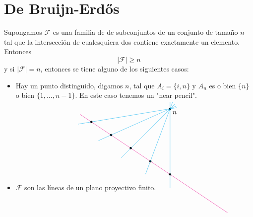 \documentclass[spanish]{book}
\theoremstyle{definition}
\begin{document}
\section{De Bruijn-Erdős}
\begin{teo}
	Supongamos $\mathcal{F}$ es una familia de de subconjuntos de un conjunto de tamaño $n$ tal que la intersección de cualesquiera dos contiene exactamente un elemento. Entonces
	\[|\mathcal{F}|\geq n\]
	y si $|\mathcal{F}|=n$, entonces se tiene alguno de los siguientes casos:
	\begin{itemize}
		\item Hay un punto distinguido, digamos $n$, tal que $A_i=\{i,n\}$ y $A_n$ es o bien $\{n\}$ o bien $\{1,\ldots,n-1\}$. En este caso tenemos un "near pencil".
		
		\[\begin{tikzpicture}
			\draw[magenta, shorten >=-100pt, shorten <=-20pt] (-2,4/3) -- (2,-4/3);
			
			\filldraw (2,2) circle (0.05) node[below right] {$n$};
			
			\foreach \x in {-2,-1,0,1,2} {
				\filldraw (\x,-\x*2/3) circle (0.05);
			}
			
			\foreach \x in {-2,-1,0,1,2} {
				\draw[cyan, shorten >=-10pt, shorten <=-20pt] (\x,-\x*2/3) -- (2,2);
			}
		\end{tikzpicture}
		\]
		\item $\mathcal{F}$ son las líneas de un plano proyectivo finito.
	\end{itemize}
\end{teo}
\end{document}
